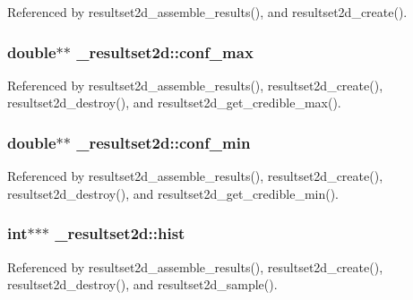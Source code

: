 Referenced by resultset2d\+\_\+assemble\+\_\+results(), and resultset2d\+\_\+create().

\subsubsection[{\texorpdfstring{conf\+\_\+max}{conf_max}}]{\setlength{\rightskip}{0pt plus 5cm}double$\ast$$\ast$ \+\_\+resultset2d\+::conf\+\_\+max}\hypertarget{struct__resultset2d_ad6c112f35d38a3b7e2f5facee0856513}{}\label{struct__resultset2d_ad6c112f35d38a3b7e2f5facee0856513}


Referenced by resultset2d\+\_\+assemble\+\_\+results(), resultset2d\+\_\+create(), resultset2d\+\_\+destroy(), and resultset2d\+\_\+get\+\_\+credible\+\_\+max().

\subsubsection[{\texorpdfstring{conf\+\_\+min}{conf_min}}]{\setlength{\rightskip}{0pt plus 5cm}double$\ast$$\ast$ \+\_\+resultset2d\+::conf\+\_\+min}\hypertarget{struct__resultset2d_a9dbd7a46c112941fe6f0af73d89782f7}{}\label{struct__resultset2d_a9dbd7a46c112941fe6f0af73d89782f7}


Referenced by resultset2d\+\_\+assemble\+\_\+results(), resultset2d\+\_\+create(), resultset2d\+\_\+destroy(), and resultset2d\+\_\+get\+\_\+credible\+\_\+min().

\subsubsection[{\texorpdfstring{hist}{hist}}]{\setlength{\rightskip}{0pt plus 5cm}int$\ast$$\ast$$\ast$ \+\_\+resultset2d\+::hist}\hypertarget{struct__resultset2d_a85cf09d081611db8511999e6fb58b6f4}{}\label{struct__resultset2d_a85cf09d081611db8511999e6fb58b6f4}


Referenced by resultset2d\+\_\+assemble\+\_\+results(), resultset2d\+\_\+create(), resultset2d\+\_\+destroy(), and resultset2d\+\_\+sample().


